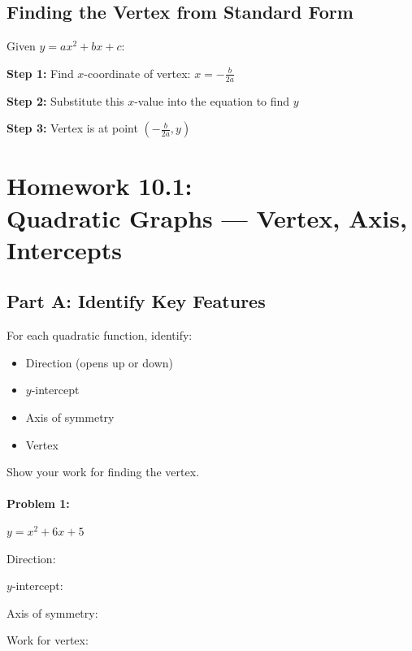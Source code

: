 \documentclass[12pt]{article}
\begin{document}
		\subsection*{Finding the Vertex from Standard Form}

			Given $y = ax^2 + bx + c$:

			\textbf{Step 1:} Find $x$-coordinate of vertex: $x = -\frac{b}{2a}$

			\textbf{Step 2:} Substitute this $x$-value into the equation to find $y$

			\textbf{Step 3:} Vertex is at point $\left(-\frac{b}{2a}, y\right)$

			\newpage

	\section*{Homework 10.1: \\ Quadratic Graphs — Vertex, Axis, Intercepts}

		\subsection*{Part A: Identify Key Features}

			For each quadratic function, identify:
			\begin{itemize}
				\item Direction (opens up or down)
				\item $y$-intercept
				\item Axis of symmetry
				\item Vertex
			\end{itemize}

			Show your work for finding the vertex.\\\\

			\textbf{Problem 1:}
            
            $y = x^2 + 6x + 5$

			\vspace{1cm}

			Direction: \underline{\hspace{2in}}

			$y$-intercept: \underline{\hspace{2in}}

			Axis of symmetry: \underline{\hspace{2in}}

			Work for vertex:

			\vspace{3cm}
\end{document}
